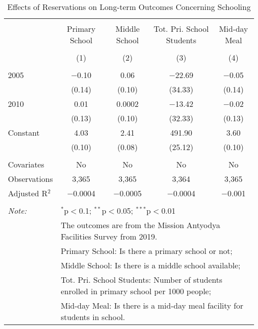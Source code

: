 
\begin{table}[!htbp] \centering 
  \caption{Effects of Reservations on Long-term Outcomes Concerning Schooling} 
  \label{raj_shrug_schooling_05_10} 
\scriptsize 
\begin{tabular}{@{\extracolsep{0pt}}lcccc} 
\\[-1.8ex]\hline 
\hline \\[-1.8ex] 
 & Primary School & Middle School & Tot. Pri. School Students & Mid-day Meal \\ 
\\[-1.8ex] & (1) & (2) & (3) & (4)\\ 
\hline \\[-1.8ex] 
 2005 & $-$0.10 & 0.06 & $-$22.69 & $-$0.05 \\ 
  & (0.14) & (0.10) & (34.33) & (0.14) \\ 
  2010 & 0.01 & 0.0002 & $-$13.42 & $-$0.02 \\ 
  & (0.13) & (0.10) & (32.33) & (0.13) \\ 
  Constant & 4.03 & 2.41 & 491.90 & 3.60 \\ 
  & (0.10) & (0.08) & (25.12) & (0.10) \\ 
 \hline \\[-1.8ex] 
Covariates & No & No & No & No \\ 
Observations & 3,365 & 3,365 & 3,364 & 3,365 \\ 
Adjusted R$^{2}$ & $-$0.0004 & $-$0.0005 & $-$0.0004 & $-$0.001 \\ 
\hline 
\hline \\[-1.8ex] 
\textit{Note:}  & \multicolumn{4}{l}{$^{*}$p$<$0.1; $^{**}$p$<$0.05; $^{***}$p$<$0.01} \\ 
 & \multicolumn{4}{l}{The outcomes are from the Mission Antyodya Facilities Survey from 2019.} \\ 
 & \multicolumn{4}{l}{Primary School: Is there a primary school or not;} \\ 
 & \multicolumn{4}{l}{Middle School: Is there is a middle school available;} \\ 
 & \multicolumn{4}{l}{Tot. Pri. School Students: Number of students enrolled in primary school per 1000 people;} \\ 
 & \multicolumn{4}{l}{Mid-day Meal: Is there is a mid-day meal facility for students in school.} \\ 
\end{tabular} 
\end{table} 
